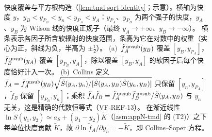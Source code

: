 \begin{figure}[htbp]
\begin{tikzpicture}
\end{tikzpicture}
\caption{快度覆盖与平方根构造（\cref{lem:tmd-sqrt-identity}；示意）。横轴为快度 $y$，$y_B<y_{P_B}<y_n<y_{P_A}<y_A$：$y_{P_A}$、$y_{P_B}$ 为两个强子的快度，$y_A$、$y_B$ 为 Wilson 线的快度正规子（最终 $y_A\to+\infty$、$y_B\to-\infty$）。
横条表示各因子所含软辐射的快度范围，条高为它在对数中的权重（实心为正，斜线为负，半高为 $\pm\frac12$）。
(a)~$\tilde f_A^{\,\rm unsub}(y_B)$ 覆盖 $[y_B,y_{P_A}]$，$\tilde f_B^{\,\rm unsub}(y_A)$ 覆盖 $[y_{P_B},y_A]$，除以覆盖 $[y_B,y_A]$ 的软因子后每个快度恰好计入一次。
(b)~Collins 定义 $\tilde f_A=\tilde f_A^{\,\rm unsub}(y_B)\sqrt{\tilde S(y_A,y_n)/[\tilde S(y_A,y_B)\tilde S(y_n,y_B)]}$ 只保留 $[y_n,y_{P_A}]$，$\tilde f_B$ 保留 $[y_{P_B},y_n]$；乘积 $\tilde f_A\tilde f_B=\tilde f_A^{\,\rm unsub}\tilde f_B^{\,\rm unsub}/\tilde S(y_A,y_B)$ 与 $y_n$ 无关，这是精确的代数恒等式（VF-REF-13）。
在渐近线性 $\ln\tilde S(y_1,y_2)\simeq a_S+(y_1-y_2)\tilde K$（\cref{asm:appN-tmd} 的 (T2)）之下每单位快度贡献 $\tilde K$，故 $\partial\ln\tilde f_A/\partial y_n=-\tilde K$，即 Collins--Soper 方程。}
\label{fig:tmd-rapidity-bars}
\end{figure}

